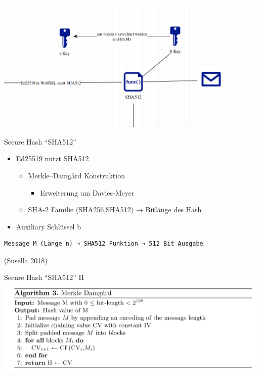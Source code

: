 \begin{frame}{}
\protect\hypertarget{section-3}{}
\includegraphics{Abbildungen/Punkt2.png}
\end{frame}

\begin{frame}[fragile]{Secure Hash ``SHA512''}
\protect\hypertarget{secure-hash-sha512}{}
\begin{itemize}
\item
  Ed25519 nutzt SHA512

  \begin{itemize}
  \tightlist
  \item
    Merkle--Damgård Konstruktion

    \begin{itemize}
    \tightlist
    \item
      Erweiterung um Davies-Meyer
    \end{itemize}
  \item
    SHA-2 Familie (SHA256,SHA512) → Bitlänge des Hash
  \end{itemize}
\item
  Auxiliary Schlüssel b
\end{itemize}

\begin{lstlisting}
Message M (Länge n) → SHA512 Funktion → 512 Bit Ausgabe
\end{lstlisting}

(Susella 2018)
\end{frame}

\begin{frame}{Secure Hash ``SHA512'' II}
\protect\hypertarget{secure-hash-sha512-ii}{}
\includegraphics{Abbildungen/MD.png}
\end{frame}

